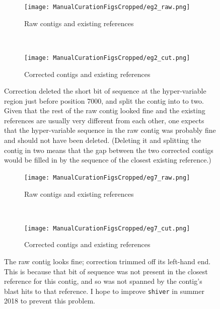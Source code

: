 \documentclass{article}
\begin{document}
\begin{landscape}
\begin{figure}[!h]
\centering
\begin{subfigure}{1.3\textwidth}
\texttt{[image: ManualCurationFigsCropped/eg2\_raw.png]}
\caption{Raw contigs and existing references}
\end{subfigure}
\vspace*{1cm} \\
\begin{subfigure}{1.3\textwidth}
\texttt{[image: ManualCurationFigsCropped/eg2\_cut.png]}
\caption{Corrected contigs and existing references}
\end{subfigure}
\caption{Correction deleted the short bit of sequence at the hyper-variable region just before position 7000, and split the contig into to two.
Given that the rest of the raw contig looked fine and the existing references are usually very different from each other, one expects that the hyper-variable sequence in the raw contig was probably fine and should not have been deleted.
(Deleting it and splitting the contig in two means that the gap between the two corrected contigs would be filled in by the sequence of the closest existing reference.)
}
\end{figure}

\begin{figure}[!h]
\centering
\begin{subfigure}{1.3\textwidth}
\texttt{[image: ManualCurationFigsCropped/eg7\_raw.png]}
\caption{Raw contigs and existing references}
\end{subfigure}
\vspace*{1cm} \\
\begin{subfigure}{1.3\textwidth}
\texttt{[image: ManualCurationFigsCropped/eg7\_cut.png]}
\caption{Corrected contigs and existing references}
\end{subfigure}
\caption{The raw contig looks fine; correction trimmed off its left-hand end.
This is because that bit of sequence was not present in the closest reference for this contig, and so was not spanned by the contig's blast hits to that reference.
I hope to improve \texttt{shiver} in summer 2018 to prevent this problem.}
\label{fig:TrimmingProblem}
\end{figure}


\end{landscape}
\end{document}
